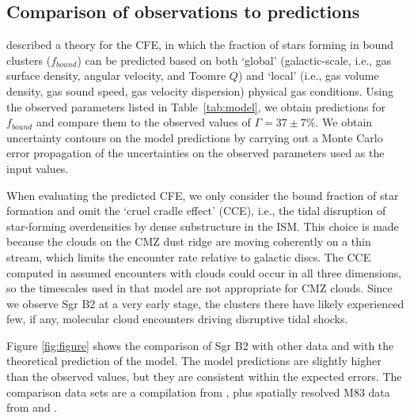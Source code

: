 \documentclass[twocolumn]{aastex62}
\begin{document}
\subsection{Comparison of observations to predictions}
\citet{Kruijssen2012a} described a theory for the CFE, in which the fraction
of stars forming in bound clusters ($f_{bound}$) can be predicted based on both
`global' (galactic-scale, i.e., gas surface density, angular velocity, and Toomre $Q$) and `local' (i.e., gas volume density, gas sound speed, gas velocity dispersion) physical gas conditions. Using the observed parameters listed in Table~\ref{tab:model}, we obtain predictions for $f_{bound}$ and compare them to the observed values of $\Gamma=37\pm7\%$. We obtain uncertainty contours on the model predictions by carrying out a Monte Carlo error propagation of the uncertainties on the observed parameters used as the input values.

When evaluating the predicted CFE, we only consider the bound fraction of star formation
and omit the `cruel cradle effect' (CCE), i.e., the tidal disruption of
star-forming overdensities by dense substructure in the ISM. This choice is
made because the clouds on the CMZ dust ridge are moving coherently on a thin
stream, which limits the encounter rate relative to galactic discs.  The CCE
computed in \citet{Kruijssen2012a} assumed encounters with clouds could occur
in all three dimensions, so the timescales used in that model are not
appropriate for CMZ clouds.  Since we observe Sgr B2 at a very early stage, the
clusters there have likely experienced few, if any, molecular cloud encounters
driving disruptive tidal shocks.

Figure \ref{fig:figure} shows the comparison of Sgr B2 with other data and with
the theoretical prediction of the \citet{Kruijssen2012a} model. The model predictions are
slightly higher than the observed values, but they are consistent within the expected
errors. The comparison data sets are a compilation from \citet{Adamo2015a}, plus spatially resolved M83 data from \citet{Freeman2017a} and \citet{Adamo2015a}.
\end{document}
